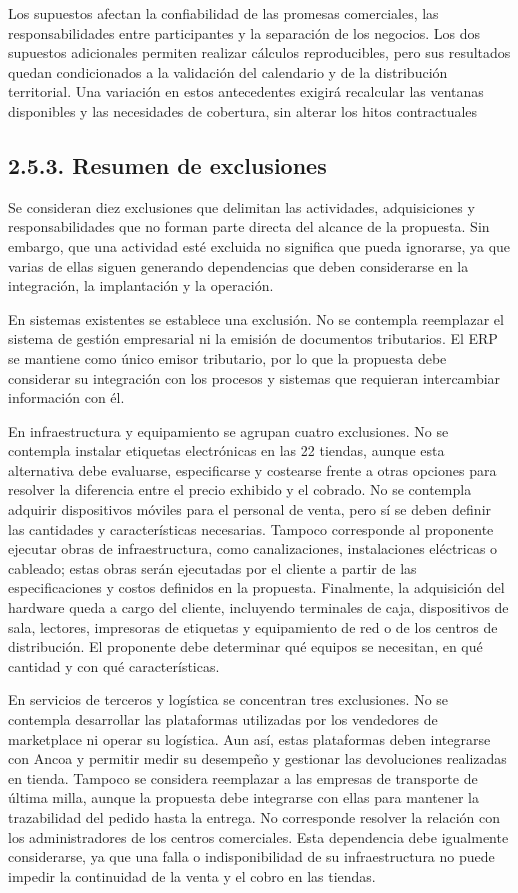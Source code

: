 \documentclass[11pt]{article}
\begin{document}
Los supuestos afectan la confiabilidad de las promesas comerciales, las responsabilidades entre participantes y la separación de los negocios. Los dos supuestos adicionales permiten realizar cálculos reproducibles, pero sus resultados quedan condicionados a la validación del calendario y de la distribución territorial. Una variación en estos antecedentes exigirá recalcular las ventanas disponibles y las necesidades de cobertura, sin alterar los hitos contractuales

\subsection{2.5.3. Resumen de exclusiones}\label{resumen-de-exclusiones}

Se consideran diez exclusiones que delimitan las actividades, adquisiciones y responsabilidades que no forman parte directa del alcance de la propuesta. Sin embargo, que una actividad esté excluida no significa que pueda ignorarse, ya que varias de ellas siguen generando dependencias que deben considerarse en la integración, la implantación y la operación.

En sistemas existentes se establece una exclusión. No se contempla reemplazar el sistema de gestión empresarial ni la emisión de documentos tributarios. El ERP se mantiene como único emisor tributario, por lo que la propuesta debe considerar su integración con los procesos y sistemas que requieran intercambiar información con él.

En infraestructura y equipamiento se agrupan cuatro exclusiones. No se contempla instalar etiquetas electrónicas en las 22 tiendas, aunque esta alternativa debe evaluarse, especificarse y costearse frente a otras opciones para resolver la diferencia entre el precio exhibido y el cobrado. No se contempla adquirir dispositivos móviles para el personal de venta, pero sí se deben definir las cantidades y características necesarias. Tampoco corresponde al proponente ejecutar obras de infraestructura, como canalizaciones, instalaciones eléctricas o cableado; estas obras serán ejecutadas por el cliente a partir de las especificaciones y costos definidos en la propuesta. Finalmente, la adquisición del hardware queda a cargo del cliente, incluyendo terminales de caja, dispositivos de sala, lectores, impresoras de etiquetas y equipamiento de red o de los centros de distribución. El proponente debe determinar qué equipos se necesitan, en qué cantidad y con qué características.

En servicios de terceros y logística se concentran tres exclusiones. No se contempla desarrollar las plataformas utilizadas por los vendedores de marketplace ni operar su logística. Aun así, estas plataformas deben integrarse con Ancoa y permitir medir su desempeño y gestionar las devoluciones realizadas en tienda. Tampoco se considera reemplazar a las empresas de transporte de última milla, aunque la propuesta debe integrarse con ellas para mantener la trazabilidad del pedido hasta la entrega. No corresponde resolver la relación con los administradores de los centros comerciales. Esta dependencia debe igualmente considerarse, ya que una falla o indisponibilidad de su infraestructura no puede impedir la continuidad de la venta y el cobro en las tiendas.
\end{document}
